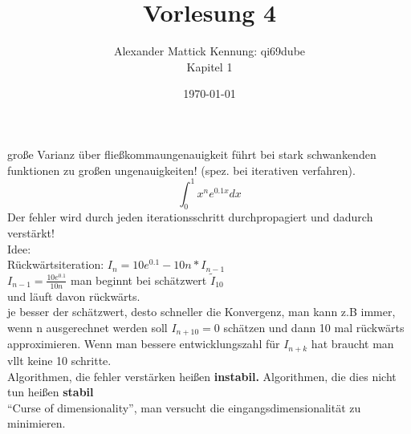 \documentclass{article}
\author{
Alexander Mattick Kennung: qi69dube\\
Kapitel 1
}
\date{\today}
\title{Vorlesung 4}
\begin{document}
	\maketitle
	große Varianz über fließkommaungenauigkeit führt bei stark schwankenden funktionen zu großen ungenauigkeiten! (spez. bei iterativen verfahren).\\
	\[\int_0^1 x^ne^{0.1x} dx\]
	Der fehler wird durch jeden iterationsschritt durchpropagiert und dadurch verstärkt!\\
	Idee:\\
	Rückwärtsiteration: $I_n = 10e^{0.1}-10n*I_{n-1}$\\
	$I_{n-1} = \frac{10e^{0.1}}{10n}$
	man beginnt bei schätzwert $\tilde I_{10}$\\
	und läuft davon rückwärts.\\
	je besser der schätzwert, desto schneller die Konvergenz, man kann z.B immer, wenn n ausgerechnet werden soll $I_{n+10} =0$ schätzen und dann 10 mal rückwärts approximieren. Wenn man bessere entwicklungszahl für $I_{n+k}$ hat braucht man vllt keine 10 schritte.\\
	Algorithmen, die fehler verstärken heißen \textbf{instabil.}
	Algorithmen, die dies nicht tun heißen \textbf{stabil}\\
	``Curse of dimensionality'', man versucht die eingangsdimensionalität zu minimieren.
\end{document}
